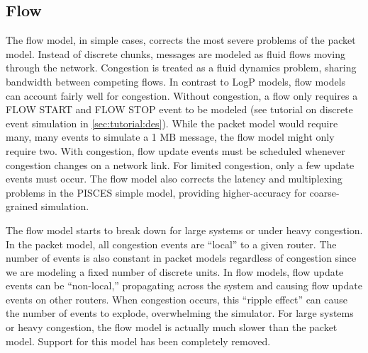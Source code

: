 \subsection{Flow}
\label{subsec:tutorial:flow}
The flow model, in simple cases, corrects the most severe problems of the packet model.
Instead of discrete chunks, messages are modeled as fluid flows moving through the network.
Congestion is treated as a fluid dynamics problem, sharing bandwidth between competing flows.
In contrast to LogP models, flow models can account fairly well for congestion.
Without congestion, a flow only requires a FLOW START and FLOW STOP event to be modeled (see tutorial on discrete event simulation in \ref{sec:tutorial:des}).
While the packet model would require many, many events to simulate a 1 MB message, the flow model might only require two.
With congestion, flow update events must be scheduled whenever congestion changes on a network link.  
For limited congestion, only a few update events must occur.
The flow model also corrects the latency and multiplexing problems in the PISCES simple model, providing higher-accuracy for coarse-grained simulation.

The flow model starts to break down for large systems or under heavy congestion.
In the packet model, all congestion events are ``local'' to a given router.  
The number of events is also constant in packet models regardless of congestion since we are modeling a fixed number of discrete units.
In flow models, flow update events can be ``non-local,'' propagating across the system and causing flow update events on other routers.
When congestion occurs, this ``ripple effect'' can cause the number of events to explode, overwhelming the simulator.
For large systems or heavy congestion, the flow model is actually much slower than the packet model. Support for this model has been completely removed.


